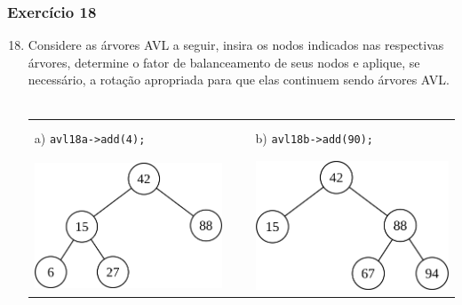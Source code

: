 \documentclass[aspectratio=169]{beamer}
\begin{document}
\begin{frame}[fragile]\frametitle{Exercício 18}
\begin{enumerate}
	\setcounter{enumi}{17}
	\item Considere as árvores AVL a seguir, insira os nodos indicados nas respectivas árvores, determine o fator de balanceamento de seus nodos e aplique, se necessário, a rotação apropriada para que elas continuem sendo árvores AVL.\\~\\
\begin{tabular}{lll}
a) \texttt{avl18a->add(4);}& ~ ~ & b) \texttt{avl18b->add(90);}\\
\includegraphics[height=0.3\paperheight]{imagens/avl15.png} & ~ ~ &
\includegraphics[height=0.3\paperheight]{imagens/avl16.png} \\
\end{tabular}
\end{enumerate}
\end{frame}
\end{document}

